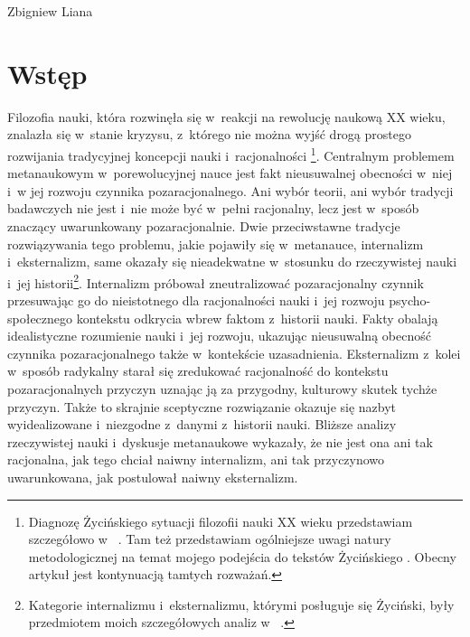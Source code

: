 \begin{artplenv}{Zbigniew Liana}
\section{Wstęp}
Filozofia nauki, która rozwinęła się w~reakcji na rewolucję naukową XX wieku, znalazła się w~stanie kryzysu, z~którego nie można wyjść drogą prostego rozwijania tradycyjnej koncepcji nauki i~racjonalności
\parencites[][s.~199]{zycinski_teizm_1985}[][s.~145]{zycinski_structure_1988}[][s.~189]{zycinski_elementy_1996}%
\footnote{Diagnozę Życińskiego sytuacji filozofii nauki XX wieku przedstawiam szczegółowo w~
\parencite[][]{liana_nauka_2019_liana}. %
 Tam też przedstawiam ogólniejsze uwagi natury metodologicznej na temat mojego podejścia do tekstów Życińskiego 
\parencite[][s.~148–152]{liana_nauka_2019_liana}. %
 Obecny artykuł jest kontynuacją tamtych rozważań.}. Centralnym problemem metanaukowym w~porewolucyjnej nauce jest fakt nieusuwalnej obecności w~niej i~w jej rozwoju czynnika pozaracjonalnego. Ani wybór teorii, ani wybór tradycji badawczych nie jest i~nie może być w~pełni racjonalny, lecz jest w~sposób znaczący uwarunkowany pozaracjonalnie. Dwie przeciwstawne tradycje rozwiązywania tego problemu, jakie pojawiły się w~metanauce, internalizm i~eksternalizm, same okazały się nieadekwatne w~stosunku do rzeczywistej nauki i~jej historii\footnote{Kategorie internalizmu i~eksternalizmu, którymi posługuje się Życiński, były przedmiotem moich szczegółowych analiz w~
\parencite[][]{liana_nauka_2019_liana}.%
}. Internalizm próbował zneutralizować pozaracjonalny czynnik przesuwając go do nieistotnego dla racjonalności nauki i~jej rozwoju psycho-społecznego kontekstu odkrycia wbrew faktom z~historii nauki. Fakty obalają idealistyczne rozumienie nauki i~jej rozwoju, ukazując nieusuwalną obecność czynnika pozaracjonalnego także w~kontekście uzasadnienia. Eksternalizm z~kolei w~sposób radykalny starał się zredukować racjonalność do kontekstu pozaracjonalnych przyczyn uznając ją za przygodny, kulturowy skutek tychże przyczyn. Także to skrajnie sceptyczne rozwiązanie okazuje się nazbyt wyidealizowane i~niezgodne z~danymi z~historii nauki. Bliższe analizy rzeczywistej nauki i~dyskusje metanaukowe wykazały, że nie jest ona ani tak racjonalna, jak tego chciał naiwny internalizm, ani tak przyczynowo uwarunkowana, jak postulował naiwny eksternalizm.


\end{artplenv}
